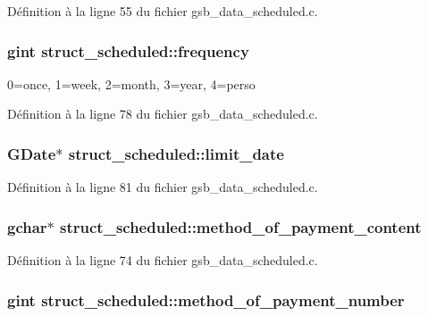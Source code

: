 Définition à la ligne 55 du fichier gsb\_\-data\_\-scheduled.c.

\subsubsection[{frequency}]{\setlength{\rightskip}{0pt plus 5cm}gint {\bf struct\_\-scheduled::frequency}}\label{structstruct__scheduled_adb335819e0678a3e20df82226e260f2c}
0=once, 1=week, 2=month, 3=year, 4=perso 

Définition à la ligne 78 du fichier gsb\_\-data\_\-scheduled.c.

\subsubsection[{limit\_\-date}]{\setlength{\rightskip}{0pt plus 5cm}GDate$\ast$ {\bf struct\_\-scheduled::limit\_\-date}}\label{structstruct__scheduled_a370416a8bfcc35d01a0cd502f0e90810}


Définition à la ligne 81 du fichier gsb\_\-data\_\-scheduled.c.

\subsubsection[{method\_\-of\_\-payment\_\-content}]{\setlength{\rightskip}{0pt plus 5cm}gchar$\ast$ {\bf struct\_\-scheduled::method\_\-of\_\-payment\_\-content}}\label{structstruct__scheduled_a137566274129d90cad69884a0394e88e}


Définition à la ligne 74 du fichier gsb\_\-data\_\-scheduled.c.

\subsubsection[{method\_\-of\_\-payment\_\-number}]{\setlength{\rightskip}{0pt plus 5cm}gint {\bf struct\_\-scheduled::method\_\-of\_\-payment\_\-number}}\label{structstruct__scheduled_a64eb781da4bacbf30690ab5f04d18e23}


